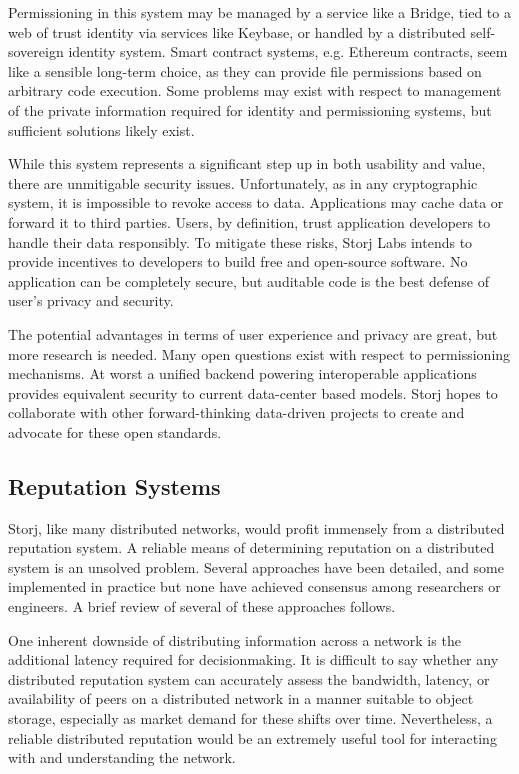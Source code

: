 \documentclass[a4paper,10pt]{article}
\begin{document}
Permissioning in this system may be managed by a service like a Bridge, tied to
a web of trust identity via services like Keybase, or handled by a distributed
self-sovereign identity system. Smart contract systems, e.g. Ethereum \cite{17}
contracts, seem like a sensible long-term choice, as they can provide file
permissions based on arbitrary code execution. Some problems may exist with
respect to management of the private information required for identity and
permissioning systems, but sufficient solutions likely exist.

While this system represents a significant step up in both usability and value,
there are unmitigable security issues. Unfortunately, as in any cryptographic
system, it is impossible to revoke access to data. Applications may cache data
or forward it to third parties. Users, by definition, trust application
developers to handle their data responsibly. To mitigate these risks, Storj Labs
intends to provide incentives to developers to build free and open-source
software. No application can be completely secure, but auditable code is the
best defense of user’s privacy and security.

The potential advantages in terms of user experience and privacy are great, but
more research is needed. Many open questions exist with respect to permissioning
mechanisms. At worst a unified backend powering interoperable applications
provides equivalent security to current data-center based models. Storj hopes to
collaborate with other forward-thinking data-driven projects to create and
advocate for these open standards.

\subsection{Reputation Systems}
Storj, like many distributed networks, would profit immensely from a distributed
reputation system. A reliable means of determining reputation on a distributed
system is an unsolved problem. Several approaches have been detailed, and some
implemented in practice but none have achieved consensus among researchers or
engineers. A brief review of several of these approaches follows.

One inherent downside of distributing information across a network is the
additional latency required for decisionmaking. It is difficult to say whether
any distributed reputation system can accurately assess the bandwidth, latency,
or availability of peers on a distributed network in a manner suitable to object
storage, especially as market demand for these shifts over time. Nevertheless, a
reliable distributed reputation would be an extremely useful tool for
interacting with and understanding the network.
\end{document}
